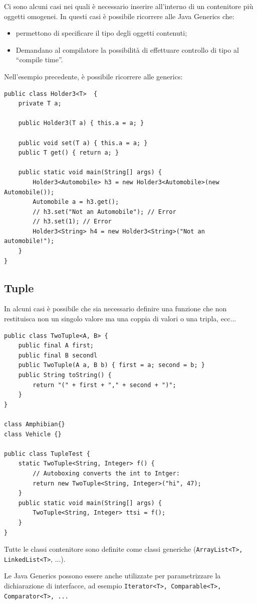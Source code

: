 \documentclass[12pt]{report}
\begin{document}
Ci sono alcuni casi nei quali è necessario inserire all'interno di un contenitore più oggetti omogenei. In questi casi è possibile ricorrere alle Java Generics che:
\begin{itemize}
	\item permettono di specificare il tipo degli oggetti contenuti;
	\item Demandano al compilatore la possibilità di effettuare controllo di tipo al ``compile time''.
\end{itemize}
Nell'esempio precedente, è possibile ricorrere alle generics:
\begin{lstlisting}[style=javastyle]
public class Holder3<T>  {
	private T a;

	public Holder3(T a) { this.a = a; }

	public void set(T a) { this.a = a; }
	public T get() { return a; }

	public static void main(String[] args) {
		Holder3<Automobile> h3 = new Holder3<Automobile>(new Automobile());
		Automobile a = h3.get();
		// h3.set("Not an Automobile"); // Error
		// h3.set(1); // Error
		Holder3<String> h4 = new Holder3<String>("Not an automobile!");
	}
}
\end{lstlisting}
\subsection{Tuple}
In alcuni casi è possibile che sia necessario definire una funzione che non restituisca non un singolo valore ma una coppia di valori o una tripla, ecc...
\begin{lstlisting}[style=javastyle]
public class TwoTuple<A, B> {
	public final A first;
	public final B secondl
	public TwoTuple(A a, B b) { first = a; second = b; }
	public String toString() {
		return "(" + first + "," + second + ")";
	}
}

class Amphibian{}
class Vehicle {}

public class TupleTest {
	static TwoTuple<String, Integer> f() {
		// Autoboxing converts the int to Intger:
		return new TwoTuple<String, Integer>("hi", 47);
	}
	public static void main(String[] args) {
		TwoTuple<String, Integer> ttsi = f();
	}
}
\end{lstlisting}
Tutte le classi contenitore sono definite come classi generiche (\texttt{ArrayList<T>, LinkedList<T>}, ...).

Le Java Generics possono essere anche utilizzate per parametrizzare la dichiarazione di interfacce, ad esempio \texttt{Iterator<T>, Comparable<T>, Comparator<T>, ...}
\end{document}
